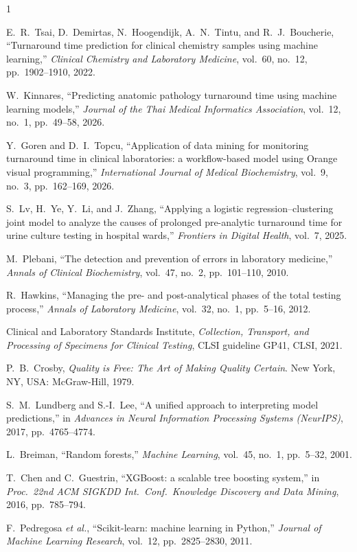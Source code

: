 \documentclass[journal]{IEEEtran}
\begin{document}
\begin{thebibliography}{1}

E.~R.~Tsai, D.~Demirtas, N.~Hoogendijk, A.~N.~Tintu, and R.~J.~Boucherie,
``Turnaround time prediction for clinical chemistry samples using machine
learning,'' \emph{Clinical Chemistry and Laboratory Medicine}, vol.~60, no.~12,
pp.~1902--1910, 2022.

W.~Kinnares, ``Predicting anatomic pathology turnaround time using machine
learning models,'' \emph{Journal of the Thai Medical Informatics Association},
vol.~12, no.~1, pp.~49--58, 2026.

Y.~Goren and D.~I.~Topcu, ``Application of data mining for monitoring turnaround
time in clinical laboratories: a workflow-based model using Orange visual
programming,'' \emph{International Journal of Medical Biochemistry}, vol.~9, no.~3,
pp.~162--169, 2026.

S.~Lv, H.~Ye, Y.~Li, and J.~Zhang, ``Applying a logistic regression--clustering
joint model to analyze the causes of prolonged pre-analytic turnaround time for
urine culture testing in hospital wards,'' \emph{Frontiers in Digital Health},
vol.~7, 2025.

M.~Plebani, ``The detection and prevention of errors in laboratory medicine,''
\emph{Annals of Clinical Biochemistry}, vol.~47, no.~2, pp.~101--110, 2010.

R.~Hawkins, ``Managing the pre- and post-analytical phases of the total testing
process,'' \emph{Annals of Laboratory Medicine}, vol.~32, no.~1, pp.~5--16, 2012.

Clinical and Laboratory Standards Institute, \emph{Collection, Transport, and
Processing of Specimens for Clinical Testing}, CLSI guideline GP41, CLSI, 2021.

P.~B.~Crosby, \emph{Quality is Free: The Art of Making Quality Certain}.
New York, NY, USA: McGraw-Hill, 1979.

S.~M.~Lundberg and S.-I.~Lee, ``A unified approach to interpreting model
predictions,'' in \emph{Advances in Neural Information Processing Systems (NeurIPS)},
2017, pp.~4765--4774.

L.~Breiman, ``Random forests,'' \emph{Machine Learning}, vol.~45, no.~1,
pp.~5--32, 2001.

T.~Chen and C.~Guestrin, ``XGBoost: a scalable tree boosting system,'' in
\emph{Proc.\ 22nd ACM SIGKDD Int.\ Conf.\ Knowledge Discovery and Data Mining},
2016, pp.~785--794.

F.~Pedregosa \emph{et al.}, ``Scikit-learn: machine learning in Python,''
\emph{Journal of Machine Learning Research}, vol.~12, pp.~2825--2830, 2011.

\end{thebibliography}
\end{document}

